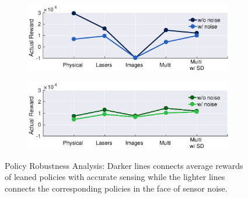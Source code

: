 \documentclass[../thesis.tex]{subfiles}
\begin{document}
\begin{figure}[t]
	\centering
	\begin{subfigure}[b]{0.48\linewidth}
		\includegraphics[width=\columnwidth,trim= 45 180 45 10, clip=true]{./MultimodalDRL/fig/actual_robust_naf}
		\label{fig:actual_robust_naf}
	\end{subfigure}
	\begin{subfigure}[b]{0.48\linewidth}
		\includegraphics[width=\columnwidth,trim= 45 180 45 10, clip=true]{./MultimodalDRL/fig/actual_robust_ddpg}
		\label{fig:actual_robust_ddpg}
	\end{subfigure}
	\caption{Policy Robustness Analysis: Darker lines connects average rewards of leaned policies with accurate sensing while the lighter lines connects the corresponding policies in the face of sensor noise.}
    \label{fig:actual_robust}
\end{figure}
\end{document}

